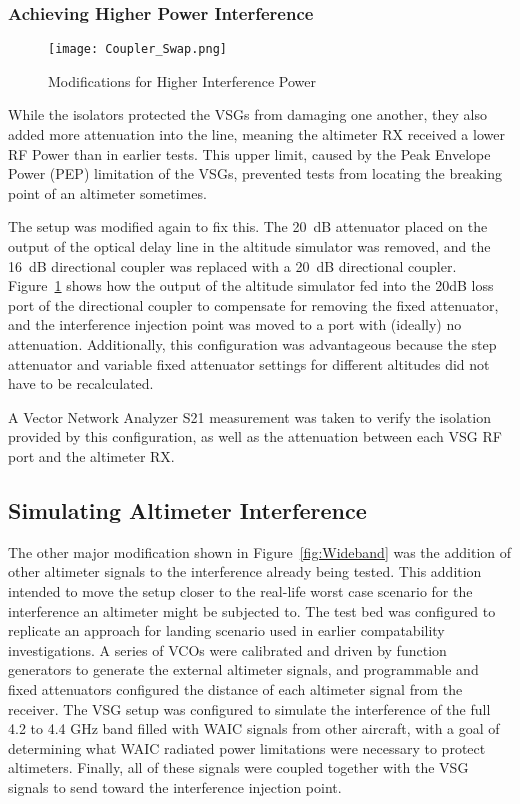 \subsubsection{Achieving Higher Power Interference}

\begin{figure}[ht]
\centering
\texttt{[image: Coupler\_Swap.png]}
\caption{Modifications for Higher Interference Power}

\label{fig:coupler_swap}

\end{figure}


While the isolators protected the VSGs from damaging one another, they also added more attenuation into the line, meaning the altimeter RX received a lower RF Power than in earlier tests. This upper limit, caused by the Peak Envelope Power (PEP) limitation of the VSGs, prevented tests from locating the breaking point of an altimeter sometimes. 


The setup was modified again to fix this. The 20~dB attenuator placed on the output of the optical delay line in the altitude simulator was removed, and the 16~dB directional coupler was replaced with a 20~dB directional coupler. Figure~\ref{fig:coupler_swap} shows how the output of the altitude simulator fed into the 20dB loss port of the directional coupler to compensate for removing the fixed attenuator, and the interference injection point was moved to a port with (ideally) no attenuation. Additionally, this configuration was advantageous because the step attenuator and variable fixed attenuator settings for different altitudes did not have to be recalculated. 

A Vector Network Analyzer S21 measurement was taken to verify the isolation provided by this configuration, as well as the attenuation between each VSG RF port and the altimeter RX. 

\subsection{Simulating Altimeter Interference}
The other major modification shown in Figure~\ref{fig:Wideband} was the addition of other altimeter signals to the interference already being tested. This addition intended to move the setup closer to the real-life worst case scenario for the interference an altimeter might be subjected to. The test bed was configured to replicate an approach for landing scenario used in earlier compatability investigations. A series of VCOs were calibrated and driven by function generators to generate the external altimeter signals, and programmable and fixed attenuators configured the distance of each altimeter signal from the receiver. The VSG setup was configured to simulate the interference of the full 4.2 to 4.4 GHz band filled with WAIC signals from other aircraft, with a goal of determining what WAIC radiated power limitations were necessary to protect altimeters. Finally, all of these signals were coupled together with the VSG signals to send toward the interference injection point. 


